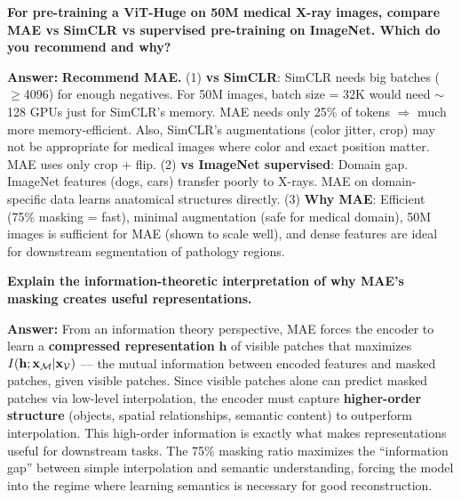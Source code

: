 \begin{examq}
\textbf{For pre-training a ViT-Huge on 50M medical X-ray images, compare MAE vs SimCLR vs supervised pre-training on ImageNet. Which do you recommend and why?}

\textbf{Answer:} \textbf{Recommend MAE.} (1) \textbf{vs SimCLR}: SimCLR needs big batches ($\geq$4096) for enough negatives. For 50M images, batch size = 32K would need $\sim$128 GPUs just for SimCLR's memory. MAE needs only 25\% of tokens $\Rightarrow$ much more memory-efficient. Also, SimCLR's augmentations (color jitter, crop) may not be appropriate for medical images where color and exact position matter. MAE uses only crop + flip. (2) \textbf{vs ImageNet supervised}: Domain gap. ImageNet features (dogs, cars) transfer poorly to X-rays. MAE on domain-specific data learns anatomical structures directly. (3) \textbf{Why MAE}: Efficient (75\% masking = fast), minimal augmentation (safe for medical domain), 50M images is sufficient for MAE (shown to scale well), and dense features are ideal for downstream segmentation of pathology regions.
\end{examq}

\begin{examq}
\textbf{Explain the information-theoretic interpretation of why MAE's masking creates useful representations.}

\textbf{Answer:} From an information theory perspective, MAE forces the encoder to learn a \textbf{compressed representation} $\mathbf{h}$ of visible patches that maximizes $I(\mathbf{h}; \mathbf{x}_{\mathcal{M}} | \mathbf{x}_{\mathcal{V}})$ — the mutual information between encoded features and masked patches, given visible patches. Since visible patches alone can predict masked patches via low-level interpolation, the encoder must capture \textbf{higher-order structure} (objects, spatial relationships, semantic content) to outperform interpolation. This high-order information is exactly what makes representations useful for downstream tasks. The 75\% masking ratio maximizes the ``information gap'' between simple interpolation and semantic understanding, forcing the model into the regime where learning semantics is necessary for good reconstruction.
\end{examq}

